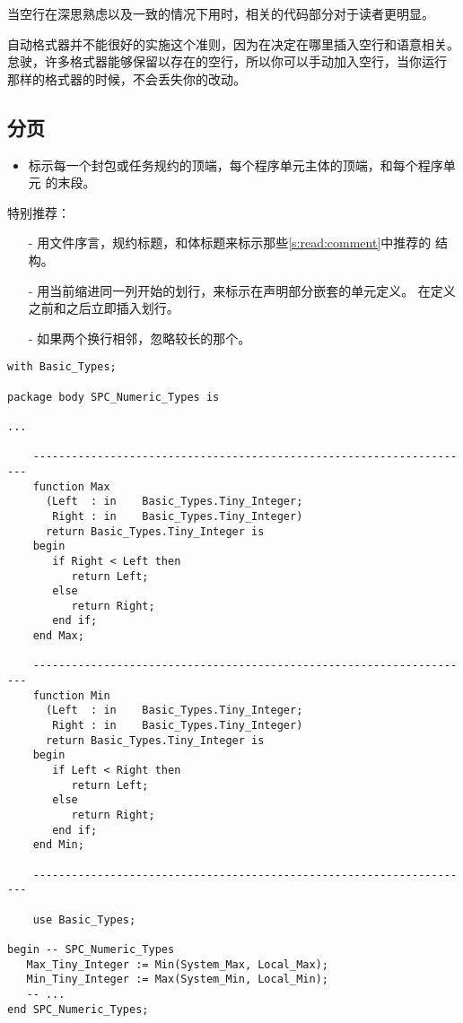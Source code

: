 \begin{blockindent}
当空行在深思熟虑以及一致的情况下用时，相关的代码部分对于读者更明显。
\end{blockindent}

\begin{blockindent}
自动格式器并不能很好的实施这个准则，因为在决定在哪里插入空行和语意相关。
怠驶，许多格式器能够保留以存在的空行，所以你可以手动加入空行，当你运行
那样的格式器的时候，不会丢失你的改动。
\end{blockindent}

\subsection{分页}
\label{c:src:code_fmt:page}
\begin{itemize}
    \item 标示每一个封包或任务规约的顶端，每个程序单元主体的顶端，和每个程序单元
的末段。
\end{itemize}

\begin{blockindent}
特别推荐：
\begin{itemize}
    \item[-] 用文件序言，规约标题，和体标题来标示那些\ref{s:read:comment}中推荐的
结构。
    \item[-] 用当前缩进同一列开始的划行，来标示在声明部分嵌套的单元定义。
在定义之前和之后立即插入划行。
    \item[-] 如果两个换行相邻，忽略较长的那个。
\end{itemize}
\end{blockindent}

\begin{blockindent}
\noindent
\begin{lstlisting}
with Basic_Types;

package body SPC_Numeric_Types is

...

    ---------------------------------------------------------------------
    function Max
	  (Left  : in    Basic_Types.Tiny_Integer;
	   Right : in    Basic_Types.Tiny_Integer)
	  return Basic_Types.Tiny_Integer is
    begin
       if Right < Left then
          return Left;
       else
          return Right;
       end if;
    end Max;

    ---------------------------------------------------------------------
    function Min
	  (Left  : in    Basic_Types.Tiny_Integer;
	   Right : in    Basic_Types.Tiny_Integer)
	  return Basic_Types.Tiny_Integer is
    begin
       if Left < Right then
          return Left;
       else
          return Right;
       end if;
    end Min;

    ---------------------------------------------------------------------

    use Basic_Types;

begin -- SPC_Numeric_Types
   Max_Tiny_Integer := Min(System_Max, Local_Max);
   Min_Tiny_Integer := Max(System_Min, Local_Min);
   -- ...
end SPC_Numeric_Types;
\end{lstlisting}
\end{blockindent}

